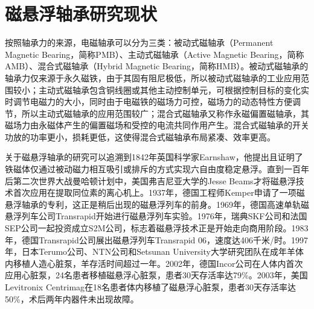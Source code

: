 \documentclass[
  lang=cn,
  degree=master,
  openany,oneside
]{nuaathesis}
\begin{document}
\section{磁悬浮轴承研究现状}

按照轴承力的来源，电磁轴承可以分为三类：被动式磁轴承（Permanent Magnetic Bearing，简称PMB）、主动式磁轴承（Active Magnetic Bearing，简称AMB）、混合式磁轴承（Hybrid Magnetic Bearing，简称HMB）。被动式磁轴承的轴承力仅来源于永久磁铁，由于其固有阻尼极低，所以被动式磁轴承的工业应用范围较小；主动式磁轴承包含铜线圈或其他主动控制单元，可根据控制目标的变化实时调节电磁力的大小，同时由于电磁铁的磁场力可控，磁场力的动态特性方便调节，所以主动式磁轴承的应用范围较广；混合式磁轴承又称作永磁偏置磁轴承，其磁场力由永磁体产生的偏置磁场和受控的电流共同作用产生。混合式磁轴承的开关功放的功率更小，损耗更低，这使得混合式磁轴承布局紧凑、效率更高。

关于磁悬浮轴承的研究可以追溯到1842年英国科学家Earnshaw，他提出且证明了铁磁体仅通过被动磁力相互吸引或排斥的方式实现六自由度稳定悬浮\cite{earnshaw1842nature}。直到一百年后第二次世界大战曼哈顿计划中，美国弗吉尼亚大学的Jesse Beams才将磁悬浮技术首次应用在提取同位素的离心机上。1937年，德国工程师Kemper申请了一项磁悬浮轴承的专利\cite{kemper1937schwebebahn}，这正是稍后出现的磁悬浮列车的前身。1969年，德国高速单轨磁悬浮列车公司Transrapid开始进行磁悬浮列车实验。1976年，瑞典SKF公司和法国SEP公司一起投资成立S2M公司，标志着磁悬浮技术正是开始走向商用阶段。1983年，德国Transrapid公司展出磁悬浮列车Transrapid 06，速度达406千米/时。1997年，日本Terumo公司、NTN公司和Setsunan University大学研究团队在成年羊体内移植人造心脏泵，羊存活时间超过一年\cite{nojiri1997more}。2002年，德国Incor公司在人体内首次应用心脏泵，24名患者移植磁悬浮心脏泵，患者30天存活率达79\%\cite{hetzer2004first}。2003年，美国Levitronix Centrimag在18名患者体内移植了磁悬浮心脏泵，患者30天存活率达50\%，术后两年内器件未出现故障\cite{de2006clinical}。
\end{document}
